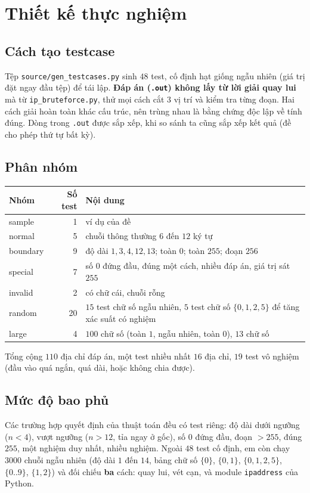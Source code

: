 \documentclass[12pt,a4paper]{article}
\begin{document}
\section{Thiết kế thực nghiệm}

\subsection{Cách tạo testcase}
Tệp \texttt{source/gen\_testcases.py} sinh $48$ test, cố định hạt giống ngẫu nhiên (giá trị đặt ngay đầu tệp) để tái lập. \textbf{Đáp án (\texttt{.out}) không lấy từ lời giải quay lui} mà từ \texttt{ip\_bruteforce.py}, thử mọi cách cắt $3$ vị trí và kiểm tra từng đoạn. Hai cách giải hoàn toàn khác cấu trúc, nên trùng nhau là bằng chứng độc lập về tính đúng. Dòng trong \texttt{.out} được sắp xếp, khi so sánh ta cũng sắp xếp kết quả (đề cho phép thứ tự bất kỳ).

\subsection{Phân nhóm}
\begin{table}[H]
\centering
\begin{tabular}{@{}lrp{8cm}@{}}
\toprule
\textbf{Nhóm} & \textbf{Số test} & \textbf{Nội dung} \\
\midrule
sample & 1 & ví dụ của đề \\
normal & 5 & chuỗi thông thường $6$ đến $12$ ký tự \\
boundary & 9 & độ dài $1, 3, 4, 12, 13$; toàn $0$; toàn $255$; đoạn $256$ \\
special & 7 & số $0$ đứng đầu, đúng một cách, nhiều đáp án, giá trị sát $255$ \\
invalid & 2 & có chữ cái, chuỗi rỗng \\
random & 20 & $15$ test chữ số ngẫu nhiên, $5$ test chữ số $\{0,1,2,5\}$ để tăng xác suất có nghiệm \\
large & 4 & $100$ chữ số (toàn $1$, ngẫu nhiên, toàn $0$), $13$ chữ số \\
\bottomrule
\end{tabular}
\end{table}
Tổng cộng $110$ địa chỉ đáp án, một test nhiều nhất $16$ địa chỉ, $19$ test vô nghiệm (đầu vào quá ngắn, quá dài, hoặc không chia được).

\subsection{Mức độ bao phủ}
Các trường hợp quyết định của thuật toán đều có test riêng: độ dài dưới ngưỡng ($n<4$), vượt ngưỡng ($n>12$, tỉa ngay ở gốc), số $0$ đứng đầu, đoạn $>255$, đúng $255$, một nghiệm duy nhất, nhiều nghiệm. Ngoài $48$ test cố định, em còn chạy $3000$ chuỗi ngẫu nhiên (độ dài $1$ đến $14$, bảng chữ số $\{0\}$, $\{0,1\}$, $\{0,1,2,5\}$, $\{0..9\}$, $\{1,2\}$) và đối chiếu \textbf{ba} cách: quay lui, vét cạn, và module \texttt{ipaddress} của Python.
\end{document}
